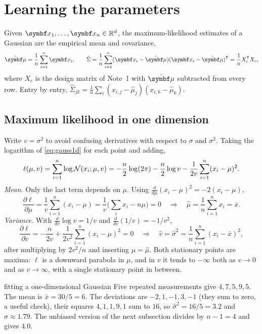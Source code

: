\documentclass[11pt]{article}
\begin{document}
\section{Learning the parameters}\label{sec:learn}

Given $\x_1, \dots, \x_n \in \R^d$, the maximum-likelihood estimates of a Gaussian are the empirical mean and
covariance,
\begin{equation}\label{eq:mlegauss}
  \hat{\vmu} = \frac{1}{n}\sum_{i=1}^n \x_i, \qquad
  \hat\Sigma = \frac{1}{n}\sum_{i=1}^n (\x_i - \hat{\vmu})(\x_i - \hat{\vmu})\T = \frac{1}{n} X_c\T X_c ,
\end{equation}
where $X_c$ is the design matrix of Note~1 with $\hat{\vmu}$ subtracted from every row. Entry by entry,
$\hat\Sigma_{jk} = \frac1n\sum_i (x_{i,j} - \hat\mu_j)(x_{i,k} - \hat\mu_k)$.

\subsection{Maximum likelihood in one dimension}\label{sec:mle1d}

Write $v = \sigma^2$ to avoid confusing derivatives with respect to $\sigma$ and $\sigma^2$. Taking the logarithm of
\eqref{eq:gauss1d} for each point and adding,
\[
  \ell(\mu, v) = \sum_{i=1}^n \log\mathcal{N}(x_i; \mu, v) = -\frac{n}{2}\log(2\pi) - \frac{n}{2}\log v
  - \frac{1}{2v}\sum_{i=1}^n (x_i - \mu)^2 .
\]
\emph{Mean.} Only the last term depends on $\mu$. Using $\frac{d}{d\mu}(x_i - \mu)^2 = -2(x_i - \mu)$,
\[
  \frac{\partial\ell}{\partial\mu} = \frac{1}{v}\sum_{i=1}^n (x_i - \mu) = \frac{1}{v}\Big(\sum_i x_i - n\mu\Big) = 0
  \quad\Longrightarrow\quad \hat\mu = \frac1n\sum_{i=1}^n x_i = \bar x .
\]
\emph{Variance.} With $\frac{d}{dv}\log v = 1/v$ and $\frac{d}{dv}(1/v) = -1/v^2$,
\[
  \frac{\partial\ell}{\partial v} = -\frac{n}{2v} + \frac{1}{2v^2}\sum_{i=1}^n (x_i - \mu)^2 = 0
  \quad\Longrightarrow\quad \hat v = \hat\sigma^2 = \frac1n\sum_{i=1}^n (x_i - \bar x)^2 ,
\]
after multiplying by $2v^2/n$ and inserting $\mu = \hat\mu$. Both stationary points are maxima: $\ell$ is a downward
parabola in $\mu$, and in $v$ it tends to $-\infty$ both as $v \to 0$ and as $v \to \infty$, with a single stationary
point in between.

\begin{worked}{fitting a one-dimensional Gaussian}
Five repeated measurements give $4, 7, 5, 9, 5$. The mean is $\bar x = 30/5 = 6$. The deviations are $-2, 1, -1, 3,
-1$ (they sum to zero, a useful check), their squares $4, 1, 1, 9, 1$ sum to $16$, so $\hat\sigma^2 = 16/5 = 3.2$ and
$\hat\sigma \approx 1.79$. The unbiased version of the next subsection divides by $n - 1 = 4$ and gives $4.0$.
\end{worked}
\end{document}
